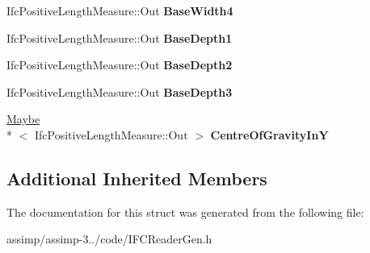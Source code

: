 \begin{DoxyCompactItemize}
\item 
\hypertarget{struct_assimp_1_1_i_f_c_1_1_ifc_crane_rail_a_shape_profile_def_aa08b6c8502a7653ea9cc9c32fd4312c7}{Ifc\+Positive\+Length\+Measure\+::\+Out {\bfseries Base\+Width4}}\label{struct_assimp_1_1_i_f_c_1_1_ifc_crane_rail_a_shape_profile_def_aa08b6c8502a7653ea9cc9c32fd4312c7}

\item 
\hypertarget{struct_assimp_1_1_i_f_c_1_1_ifc_crane_rail_a_shape_profile_def_a033a412ad22b01f6134a94105410edb1}{Ifc\+Positive\+Length\+Measure\+::\+Out {\bfseries Base\+Depth1}}\label{struct_assimp_1_1_i_f_c_1_1_ifc_crane_rail_a_shape_profile_def_a033a412ad22b01f6134a94105410edb1}

\item 
\hypertarget{struct_assimp_1_1_i_f_c_1_1_ifc_crane_rail_a_shape_profile_def_af4b6cd5795a7cf4926df20d2f70d3851}{Ifc\+Positive\+Length\+Measure\+::\+Out {\bfseries Base\+Depth2}}\label{struct_assimp_1_1_i_f_c_1_1_ifc_crane_rail_a_shape_profile_def_af4b6cd5795a7cf4926df20d2f70d3851}

\item 
\hypertarget{struct_assimp_1_1_i_f_c_1_1_ifc_crane_rail_a_shape_profile_def_a543bea45a8d0d4cb2574e7e83dcb629a}{Ifc\+Positive\+Length\+Measure\+::\+Out {\bfseries Base\+Depth3}}\label{struct_assimp_1_1_i_f_c_1_1_ifc_crane_rail_a_shape_profile_def_a543bea45a8d0d4cb2574e7e83dcb629a}

\item 
\hypertarget{struct_assimp_1_1_i_f_c_1_1_ifc_crane_rail_a_shape_profile_def_a74963af840cd327ecc5d2b086862a454}{\hyperlink{struct_assimp_1_1_s_t_e_p_1_1_maybe}{Maybe}\\*
$<$ Ifc\+Positive\+Length\+Measure\+::\+Out $>$ {\bfseries Centre\+Of\+Gravity\+In\+Y}}\label{struct_assimp_1_1_i_f_c_1_1_ifc_crane_rail_a_shape_profile_def_a74963af840cd327ecc5d2b086862a454}

\end{DoxyCompactItemize}
\subsection*{Additional Inherited Members}


The documentation for this struct was generated from the following file\+:\begin{DoxyCompactItemize}
\item 
assimp/assimp-\/3../code/I\+F\+C\+Reader\+Gen.\+h\end{DoxyCompactItemize}
